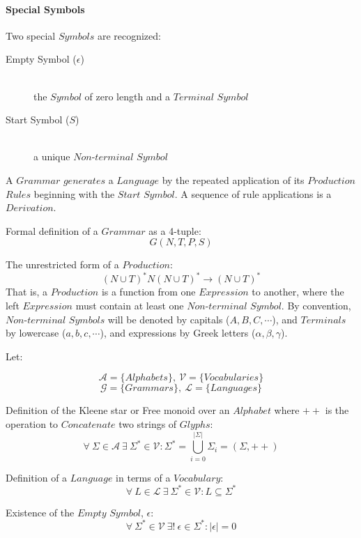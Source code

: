 \documentclass{article}
\begin{document}
\paragraph{Special Symbols}

Two special $Symbols$ are recognized:

    \begin{description}

    \item[Empty Symbol ($\epsilon$)] \hfill \\
    the $Symbol$ of zero length and a $Terminal$ $Symbol$

    \item[Start Symbol ($S$)] \hfill \\
    a unique $Non$-$terminal$ $Symbol$

    \end{description}

A $Grammar$ $generates$ a $Language$ by the repeated application of
its $Production$ $Rules$ beginning with the $Start$ $Symbol$. A
sequence of rule applications is a $Derivation$.

Formal definition of a $Grammar$ as a 4-tuple:
\[
    G(N,T,P,S)
\]

The unrestricted form of a $Production$:
\[
    (N \cup T)^*N(N \cup T)^* \rightarrow (N \cup T)^*
\]
That is, a $Production$ is a function from one $Expression$ to
another, where the left $Expression$ must contain at least one
$Non$-$terminal$ $Symbol$. By convention, $Non$-$terminal$ $Symbols$
will be denoted by capitals ($A,B,C,\cdots$), and $Terminals$ by
lowercase ($a,b,c,\cdots$), and expressions by Greek letters
($\alpha,\beta,\gamma$).

Let:

\[
    \mathcal{A} = \{ Alphabets \},\: \mathcal{V} = \{ Vocabularies \}
\] \[
    \mathcal{G} = \{ Grammars \},\: \mathcal{L} = \{ Languages \}
\]

    \begin{description}

    \item Definition of the Kleene star or Free monoid over an
      $Alphabet$ where $++$ is the operation to $Concatenate$ two
      strings of $Glyphs$:
    \[
        \forall \: \Sigma \in \mathcal{A} \:
        \exists \: \Sigma^* \in \mathcal{V}
        : \Sigma^* = \bigcup_{i=0}^{|\Sigma|} \Sigma_i
        = (\Sigma,++)
    \]

    \item Definition of a $Language$ in terms of a $Vocabulary$:
    \[
        \forall \: L \in \mathcal{L} \:
        \exists \: \Sigma^* \in \mathcal{V}
        : L \subseteq \Sigma^*
    \]

    \item Existence of the $Empty$ $Symbol$, $\epsilon$:
    \[
        \forall \: \Sigma^* \in \mathcal{V} \:
        \exists ! \: \epsilon \in \Sigma^*
        : |\epsilon|=0
    \]

    \end{description}
\end{document}
